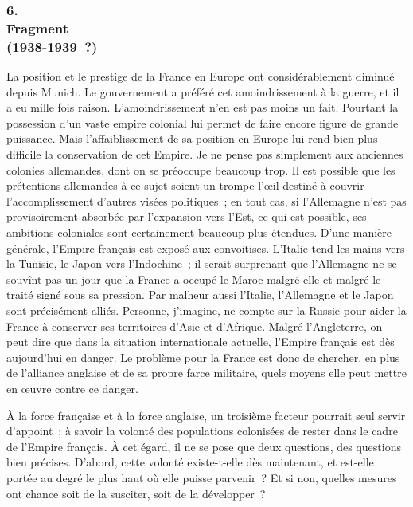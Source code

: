 \documentclass[french,twoside]{book} %
\begin{document}
\subsubsection[{6. Fragment, (1938-1939 ?)}]{6. \\
Fragment \\
(1938-1939 ?)}
\noindent \par
La position et le prestige de la France en Europe ont considérablement diminué depuis Munich. Le gouvernement a préféré cet amoindrissement à la guerre, et il a eu mille fois raison. L'amoindrissement n'en est pas moins un fait. Pourtant la possession d'un vaste empire colonial lui permet de faire encore figure de grande puissance. Mais l'affaiblissement de sa position en Europe lui rend bien plus difficile la conservation de cet Empire. Je ne pense pas simplement aux anciennes colonies allemandes, dont on se préoccupe beaucoup trop. Il est possible que les prétentions allemandes à ce sujet soient un trompe-l’œil destiné à couvrir l'accomplissement d'autres visées politi­ques ; en tout cas, si l'Allemagne n'est pas provisoirement absorbée par l'expansion vers l'Est, ce qui est possible, ses ambitions coloniales sont certai­nement beaucoup plus étendues. D'une manière générale, l'Empire français est exposé aux convoitises. L'Italie tend les mains vers la Tunisie, le Japon vers l'Indochine ; il serait surprenant que l'Allemagne ne se souvînt pas un jour que la France a occupé le Maroc malgré elle et malgré le traité signé sous sa pression. Par malheur aussi l'Italie, l'Allemagne et le Japon sont précisément alliés. Personne, j'imagine, ne compte sur la Russie pour aider la France à conserver ses territoires d'Asie et d'Afrique. Malgré l'Angleterre, on peut dire que dans la situation internationale actuelle, l'Empire français est dès aujour­d'hui en danger. Le problème pour la France est donc de chercher, en plus de l'alliance anglaise et de sa propre farce militaire, quels moyens elle peut mettre en œuvre contre ce danger.\par
À la force française et à la force anglaise, un troisième facteur pourrait seul servir d'appoint ; à savoir la volonté des populations colonisées de rester dans le cadre de l'Empire français. À cet égard, il ne se pose que deux questions, des questions bien précises. D'abord, cette volonté existe-t-elle dès maintenant, et est-elle portée au degré le plus haut où elle puisse parvenir ? Et si non, quelles mesures ont chance soit de la susciter, soit de la développer ?\par
\end{document}
